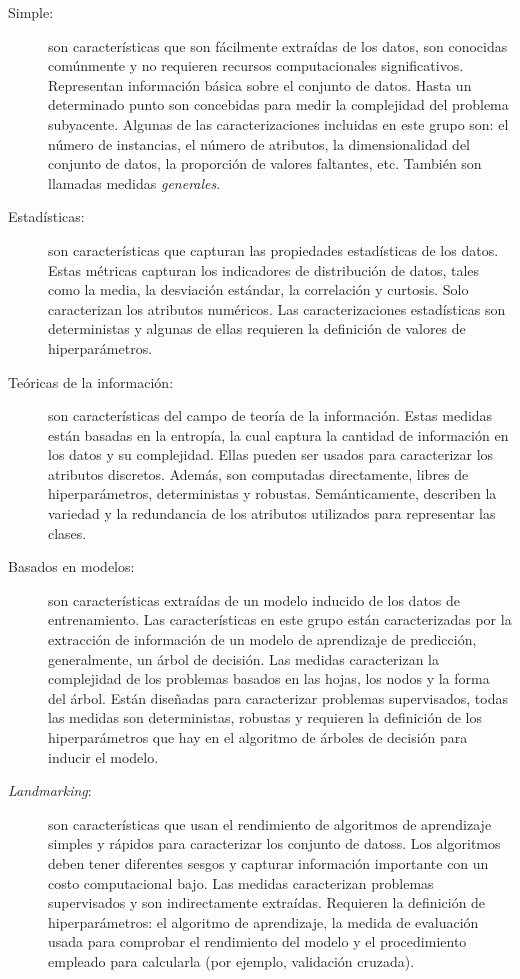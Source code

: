 \begin{description}
	\item[Simple:] son características que son fácilmente extraídas de los
    datos, son conocidas comúnmente y no requieren recursos computacionales
    significativos. Representan información básica sobre el conjunto de datos.
    Hasta un determinado punto son concebidas para medir la complejidad del
    problema subyacente. Algunas de las caracterizaciones incluidas en este
    grupo son: el número de instancias, el número de atributos, la
    dimensionalidad del conjunto de datos, la proporción de valores faltantes,
    etc. También son llamadas medidas \textit{generales}.
	
	\item[Estadísticas:] son características que capturan las propiedades
    estadísticas de los datos. Estas métricas capturan los indicadores de
    distribución de datos, tales como la media, la desviación estándar,
    la correlación y curtosis. Solo caracterizan los atributos numéricos. Las
    caracterizaciones estadísticas son deterministas y algunas de ellas
    requieren la definición de valores de hiperparámetros.
	
	\item[Teóricas de la información:] son características del campo de teoría
    de la información. Estas medidas están basadas en la entropía, la cual
    captura la cantidad de información en los datos y su complejidad. Ellas
    pueden ser usados para caracterizar los atributos discretos. Además, son
    computadas directamente, libres de hiperparámetros, deterministas y
    robustas. Semánticamente, describen la variedad y la redundancia de los
    atributos utilizados para representar las clases.
	
	\item[Basados en modelos:] son características extraídas de un modelo
    inducido de los datos de entrenamiento. Las características en este grupo
    están caracterizadas por la extracción de información de un modelo de
    aprendizaje de predicción, generalmente, un árbol de decisión. Las medidas
    caracterizan la complejidad de los problemas basados en las hojas, los
    nodos y la forma del árbol. Están diseñadas para caracterizar problemas
    supervisados, todas las medidas son deterministas, robustas y requieren la
    definición de los hiperparámetros que hay en el algoritmo de árboles de
    decisión para inducir el modelo.
	
	\item[\textit{Landmarking}:] son características que usan el rendimiento de
    algoritmos de aprendizaje simples y rápidos para caracterizar los conjunto
    de datoss. Los algoritmos deben tener diferentes sesgos y capturar
    información importante con un costo computacional bajo. Las medidas
    caracterizan problemas supervisados y son indirectamente extraídas.
    Requieren la definición de hiperparámetros: el algoritmo de aprendizaje,
    la medida de evaluación usada para comprobar el rendimiento del modelo y
    el procedimiento empleado para calcularla (por ejemplo, validación cruzada).
\end{description}

